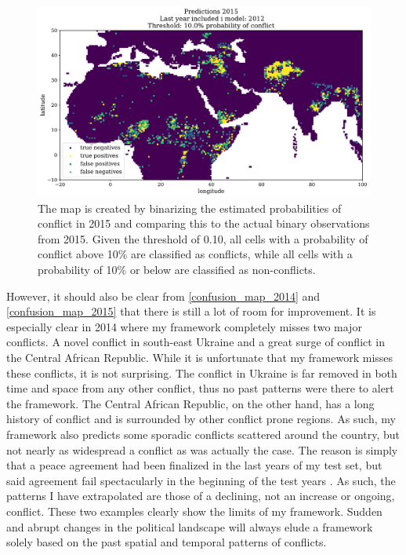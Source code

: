 \documentclass[a4paper]{article}
\begin{document}
\begin{figure}[!htb]
	\centering
	\includegraphics[scale=0.47]{confusion_map_2015.pdf}
    \caption{\footnotesize{The map is created by binarizing the estimated probabilities of conflict in 2015 and comparing this to the actual binary observations from 2015. Given the threshold of 0.10, all cells with a probability of conflict above 10\% are classified as conflicts, while all cells with a probability of 10\% or below are classified as non-conflicts.}}\label{confusion_map_2015}
\end{figure}

However, it should also be clear from \autoref{confusion_map_2014} and \autoref{confusion_map_2015} that there is still a lot of room for improvement. It is especially clear in 2014 where my framework completely misses two major conflicts. A novel conflict in south-east Ukraine and a great surge of conflict in the Central African Republic. While it is unfortunate that my framework misses these conflicts, it is not surprising. The conflict in Ukraine is far removed in both time and space from any other conflict, thus no past patterns were there to alert the framework. The Central African Republic, on the other hand, has a long history of conflict and is surrounded by other conflict prone regions. As such, my framework also predicts some sporadic conflicts scattered around the country, but not nearly as widespread a conflict as was actually the case. The reason is simply that a peace agreement had been finalized in the last years of my test set, but said agreement fail spectacularly in the beginning of the test years \citep{bbc}. As such, the patterns I have extrapolated are those of a declining, not an increase or ongoing, conflict. These two examples clearly show the limits of my framework. Sudden and abrupt changes in the political landscape will always elude a framework solely based on the past spatial and temporal patterns of conflicts.\par
\end{document}
